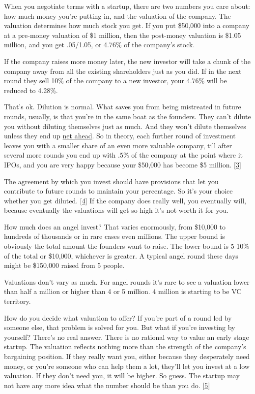 When you negotiate terms with a startup, there are two numbers you care
about: how much money you're putting in, and the valuation of the
company. The valuation determines how much stock you get. If you put
\$50,000 into a company at a pre-money valuation of \$1 million, then
the post-money valuation is \$1.05 million, and you get .05/1.05, or
4.76\% of the company's stock.

If the company raises more money later, the new investor will take a
chunk of the company away from all the existing shareholders just as you
did. If in the next round they sell 10\% of the company to a new
investor, your 4.76\% will be reduced to 4.28\%.

That's ok. Dilution is normal. What saves you from being mistreated in
future rounds, usually, is that you're in the same boat as the founders.
They can't dilute you without diluting themselves just as much. And they
won't dilute themselves unless they end up \href{equity.html}{net
ahead}. So in theory, each further round of investment leaves you with a
smaller share of an even more valuable company, till after several more
rounds you end up with .5\% of the company at the point where it IPOs,
and you are very happy because your \$50,000 has become \$5 million.
{[}\hyperref[f3n]{3}{]}

The agreement by which you invest should have provisions that let you
contribute to future rounds to maintain your percentage. So it's your
choice whether you get diluted. {[}\hyperref[f4n]{4}{]} If the company
does really well, you eventually will, because eventually the valuations
will get so high it's not worth it for you.

How much does an angel invest? That varies enormously, from \$10,000 to
hundreds of thousands or in rare cases even millions. The upper bound is
obviously the total amount the founders want to raise. The lower bound
is 5-10\% of the total or \$10,000, whichever is greater. A typical
angel round these days might be \$150,000 raised from 5 people.

Valuations don't vary as much. For angel rounds it's rare to see a
valuation lower than half a million or higher than 4 or 5 million. 4
million is starting to be VC territory.

How do you decide what valuation to offer? If you're part of a round led
by someone else, that problem is solved for you. But what if you're
investing by yourself? There's no real answer. There is no rational way
to value an early stage startup. The valuation reflects nothing more
than the strength of the company's bargaining position. If they really
want you, either because they desperately need money, or you're someone
who can help them a lot, they'll let you invest at a low valuation. If
they don't need you, it will be higher. So guess. The startup may not
have any more idea what the number should be than you do.
{[}\hyperref[f5n]{5}{]}

